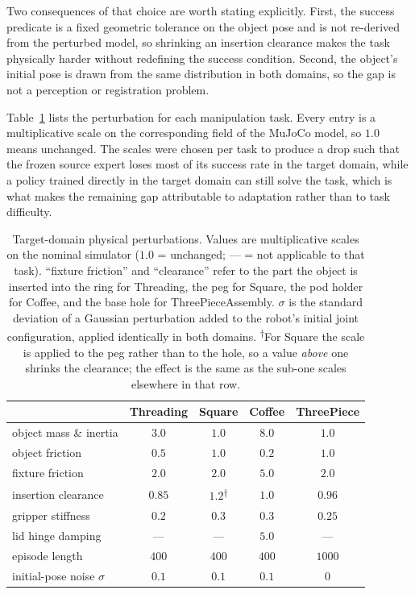 \documentclass{article} %
\begin{document}
Two consequences of that choice are worth stating explicitly. First, the success predicate is a fixed geometric tolerance on the object pose and is not re-derived from the perturbed model, so shrinking an insertion clearance makes the task physically harder without redefining the success condition. Second, the object's initial pose is drawn from the same distribution in both domains, so the gap is not a perception or registration problem.

Table~\ref{tab:app-targets} lists the perturbation for each manipulation task. Every entry is a multiplicative scale on the corresponding field of the MuJoCo model, so $1.0$ means unchanged. The scales were chosen per task to produce a drop such that the frozen source expert loses most of its success rate in the target domain, while a policy trained directly in the target domain can still solve the task, which is what makes the remaining gap attributable to adaptation rather than to task difficulty.

\begin{table}[h]
\centering
\caption{Target-domain physical perturbations. Values are multiplicative scales
on the nominal simulator ($1.0$ = unchanged; --- = not applicable to
that task). ``fixture friction'' and ``clearance'' refer to the part the object is inserted into the ring for Threading, the peg for Square, the pod holder for Coffee, and the base hole for ThreePieceAssembly. $\sigma$ is the standard
deviation of a Gaussian perturbation added to the robot's initial joint
configuration, applied identically in both domains. \textsuperscript{$\dagger$}For Square the scale is applied to the peg rather
than to the hole, so a value \emph{above} one shrinks the clearance; the effect
is the same as the sub-one scales elsewhere in that row.}
\label{tab:app-targets}
\small
\begin{tabular}{lcccc}
\toprule
 & Threading & Square & Coffee & ThreePiece \\
\midrule
object mass \& inertia      & $3.0$   & $1.0$     & $8.0$   & $1.0$     \\
object friction             & $0.5$   & $1.0$    & $0.2$   & $1.0$     \\
fixture friction            & $2.0$   & $2.0$   & $5.0$   & $2.0$   \\
insertion clearance         & $0.85$  & $1.2$\textsuperscript{$\dagger$} & $1.0$ & $0.96$ \\
gripper stiffness           & $0.2$  & $0.3$   & $0.3$   & $0.25$  \\
lid hinge damping           & ---     & ---     & $5.0$   & ---     \\
\midrule
episode length              & $400$   & $400$   & $400$   & $1000$  \\
initial-pose noise $\sigma$ & $0.1$   & $0.1$   & $0.1$   & $0$     \\
\bottomrule
\end{tabular}
\end{table}
\end{document}
